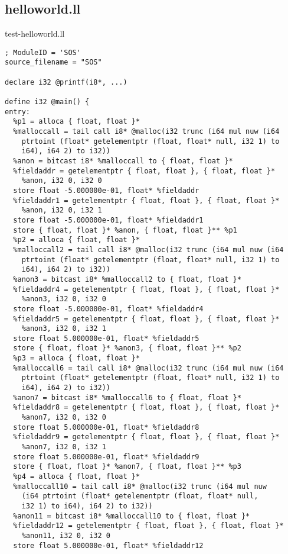 \documentclass[main.tex]{subfiles}
\begin{document}
\subsection{helloworld.ll}
{\small	
\colorbox{green!30}{test-helloworld.ll}
\begin{lstlisting}
; ModuleID = 'SOS'
source_filename = "SOS"

declare i32 @printf(i8*, ...)

define i32 @main() {
entry:
  %p1 = alloca { float, float }*
  %malloccall = tail call i8* @malloc(i32 trunc (i64 mul nuw (i64 
    ptrtoint (float* getelementptr (float, float* null, i32 1) to 
    i64), i64 2) to i32))
  %anon = bitcast i8* %malloccall to { float, float }*
  %fieldaddr = getelementptr { float, float }, { float, float }* 
    %anon, i32 0, i32 0
  store float -5.000000e-01, float* %fieldaddr
  %fieldaddr1 = getelementptr { float, float }, { float, float }* 
    %anon, i32 0, i32 1
  store float -5.000000e-01, float* %fieldaddr1
  store { float, float }* %anon, { float, float }** %p1
  %p2 = alloca { float, float }*
  %malloccall2 = tail call i8* @malloc(i32 trunc (i64 mul nuw (i64 
    ptrtoint (float* getelementptr (float, float* null, i32 1) to 
    i64), i64 2) to i32))
  %anon3 = bitcast i8* %malloccall2 to { float, float }*
  %fieldaddr4 = getelementptr { float, float }, { float, float }* 
    %anon3, i32 0, i32 0
  store float -5.000000e-01, float* %fieldaddr4
  %fieldaddr5 = getelementptr { float, float }, { float, float }* 
    %anon3, i32 0, i32 1
  store float 5.000000e-01, float* %fieldaddr5
  store { float, float }* %anon3, { float, float }** %p2
  %p3 = alloca { float, float }*
  %malloccall6 = tail call i8* @malloc(i32 trunc (i64 mul nuw (i64 
    ptrtoint (float* getelementptr (float, float* null, i32 1) to 
    i64), i64 2) to i32))
  %anon7 = bitcast i8* %malloccall6 to { float, float }*
  %fieldaddr8 = getelementptr { float, float }, { float, float }* 
    %anon7, i32 0, i32 0
  store float 5.000000e-01, float* %fieldaddr8
  %fieldaddr9 = getelementptr { float, float }, { float, float }* 
    %anon7, i32 0, i32 1
  store float 5.000000e-01, float* %fieldaddr9
  store { float, float }* %anon7, { float, float }** %p3
  %p4 = alloca { float, float }*
  %malloccall10 = tail call i8* @malloc(i32 trunc (i64 mul nuw 
    (i64 ptrtoint (float* getelementptr (float, float* null, 
    i32 1) to i64), i64 2) to i32))
  %anon11 = bitcast i8* %malloccall10 to { float, float }*
  %fieldaddr12 = getelementptr { float, float }, { float, float }* 
    %anon11, i32 0, i32 0
  store float 5.000000e-01, float* %fieldaddr12

\end{lstlisting}}
\end{document}
